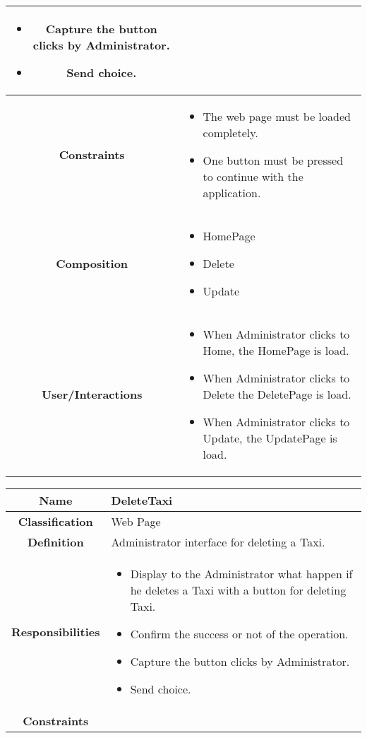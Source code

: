 \documentclass[11pt, a4paper,titlepage]{article}
\begin{document}
\begin{enumerate}
\begin{tabularx}{\textwidth}{| c | X |}
\begin{itemize}
		\item Capture the button clicks by Administrator.
		\item Send choice.
	\end{itemize}
	\\
	\hline
	\textbf{Constraints} &
	\begin{itemize}
		\item  The web page must be loaded completely.
		\item One button must be pressed to continue with the application.
	\end{itemize}
	\\
	\hline
	\textbf{Composition} &
	\begin{itemize}
		\item HomePage
		\item Delete
		\item Update
	\end{itemize}
	\\
	\hline
	\textbf{User/Interactions} &
	\begin{itemize}
		\item When Administrator clicks to Home, the HomePage is load.    	
		\item When Administrator clicks to Delete the DeletePage is load.    	
		\item When Administrator clicks to Update, the UpdatePage is load.
	\end{itemize}
	\\
	\hline 
\end{tabularx}
\begin{tabularx}{\textwidth}{| c | X |}
	\hline
	\textbf{Name} &
	DeleteTaxi
	\\
	\hline
	\textbf{Classification} &
	Web Page
	\\
	\hline
	\textbf{Definition} &
	Administrator interface for deleting a Taxi.\\
	\hline
	\textbf{Responsibilities} &
	\begin{itemize}
		\item Display to the Administrator what happen if he deletes a Taxi with a button for deleting Taxi.
		\item Confirm the success or not of the operation.
		\item Capture the button clicks by Administrator.
		\item Send choice.
	\end{itemize}
	\\
	\hline
	\textbf{Constraints} &
	\begin{itemize}

\end{itemize}
\end{tabularx}
\end{enumerate}
\end{document}
